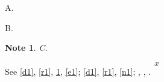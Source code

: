 \documentclass{article}
\newtheorem{note}[remark]{Note}
\begin{document}
\begin{definition}\label{d1} A. \end{definition}
\begin{remark}\label{r1} B. \end{remark}
\begin{note}\label{n1} C. \end{note}
\begin{equation}x\label{e1}\end{equation}
See \ref{d1}, \ref{r1}, \ref{n1}, \ref{e1}; \autoref{d1}, \autoref{r1}, \autoref{n1}; ,
, .
\end{document}
